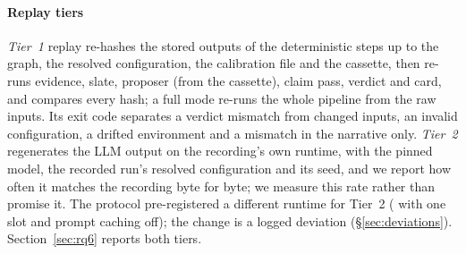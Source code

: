 \paragraph{Replay tiers}
\emph{Tier~1} replay re-hashes the stored outputs of the deterministic steps up to the graph, the resolved configuration, the calibration file and the cassette, then re-runs evidence, slate, proposer (from the cassette), claim pass, verdict and card, and compares every hash; a full mode re-runs the whole pipeline from the raw inputs.
Its exit code separates a verdict mismatch from changed inputs, an invalid configuration, a drifted environment and a mismatch in the narrative only.
\emph{Tier~2} regenerates the LLM output on the recording's own runtime, with the pinned model, the recorded run's resolved configuration and its seed, and we report how often it matches the recording byte for byte; we measure this rate rather than promise it.
The protocol pre-registered a different runtime for Tier~2 ( with one slot and prompt caching off); the change is a logged deviation (\S\ref{sec:deviations}).
Section~\ref{sec:rq6} reports both tiers.
